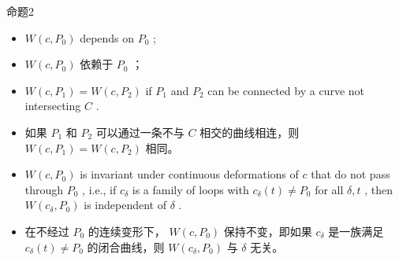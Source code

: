 \begin{tcolorbox}
命题2
\end{tcolorbox}

\HRule

\begin{itemize}
\item \(W\left( {c,{P}_{0}}\right)\) depends on \({P}_{0}\) ;
\end{itemize}

\begin{tcolorbox}
\begin{itemize}
\item \(W\left( {c,{P}_{0}}\right)\) 依赖于 \({P}_{0}\) ；
\end{itemize}
\end{tcolorbox}

\begin{itemize}
\item \(W\left( {c,{P}_{1}}\right)  = W\left( {c,{P}_{2}}\right)\) if \({P}_{1}\) and \({P}_{2}\) can be connected by a curve not intersecting \(C\) .
\end{itemize}

\begin{tcolorbox}
\begin{itemize}
\item 如果 \({P}_{1}\) 和 \({P}_{2}\) 可以通过一条不与 \(C\) 相交的曲线相连，则 \(W\left( {c,{P}_{1}}\right)  = W\left( {c,{P}_{2}}\right)\) 相同。
\end{itemize}
\end{tcolorbox}

\begin{itemize}
\item \(W\left( {c,{P}_{0}}\right)\) is invariant under continuous deformations of \(c\) that do not pass through \({P}_{0}\) , i.e., if \({c}_{\delta }\) is a family of loops with \({c}_{\delta }\left( t\right)  \neq  {P}_{0}\) for all \(\delta ,t\) , then \(W\left( {{c}_{\delta },{P}_{0}}\right)\) is independent of \(\delta\) .
\end{itemize}

\begin{tcolorbox}
\begin{itemize}
\item 在不经过 \({P}_{0}\) 的连续变形下， \(W\left( {c,{P}_{0}}\right)\) 保持不变，即如果 \({c}_{\delta }\) 是一族满足 \({c}_{\delta }\left( t\right)  \neq  {P}_{0}\) 的闭合曲线，则 \(W\left( {{c}_{\delta },{P}_{0}}\right)\) 与 \(\delta\) 无关。
\end{itemize}
\end{tcolorbox}

